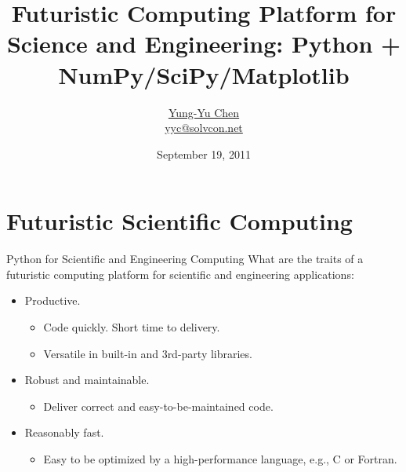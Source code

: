 \documentclass[dvips,xcolor=pst]{beamer}
\title[Futuristic Computing with Python]{Futuristic Computing Platform for
Science and Engineering: Python + NumPy/SciPy/Matplotlib}
\author[\href{http://solvcon.net/yyc/}{Chen}]%
{\href{http://solvcon.net/yyc/}{Yung-Yu Chen} \\ {\scriptsize
\url{yyc@solvcon.net}}}
\institute[PyHUG]{Python Hsinchu User Group}
\date[2011/9/19]{September 19, 2011}
\begin{document}
\begin{frame}
\titlepage
\end{frame}

\section{
Futuristic Scientific Computing
}

\begin{frame}{
%
Python for Scientific and Engineering Computing
%
} \large
What are the traits of a futuristic computing platform for scientific and
engineering applications:
\begin{itemize} \large
  \item Productive.
  \begin{itemize} \large
    \item Code quickly.  Short time to delivery.
    \item Versatile in built-in and 3rd-party libraries.
  \end{itemize}
  \item Robust and maintainable.
  \begin{itemize} \large
    \item Deliver correct and easy-to-be-maintained code.
  \end{itemize}
  \item Reasonably fast.
  \begin{itemize} \large
    \item Easy to be optimized by a high-performance language, e.g., C or
    Fortran.
  \end{itemize}
\end{itemize}
\end{frame}
\end{document}
